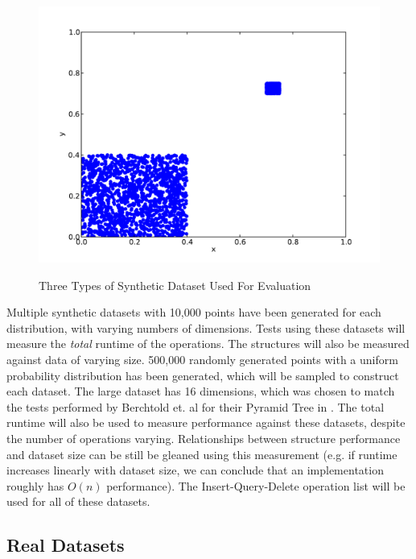 \begin{figure}
\begin{center}
			\begin{subfloat} {%
				\includegraphics[scale=0.25]{figures/clustered_distribution.pdf}
			}
			\end{subfloat}			  
		\end{center}

		\caption{Three Types of Synthetic Dataset Used For Evaluation}
		\label{fig:synthetic-data}
\end{figure}

Multiple synthetic datasets with 10,000 points have been generated for each distribution, with varying numbers of dimensions. Tests using these datasets will measure the \textit{total} runtime of the operations. The structures will also be measured against data of varying size. 500,000 randomly generated points with a uniform probability distribution has been generated, which will be sampled to construct each dataset. The large dataset has 16 dimensions, which was chosen to match the tests performed by Berchtold et. al for their Pyramid Tree in \cite{pyramid-tree}. The total runtime will also be used to measure performance against these datasets, despite the number of operations varying. Relationships between structure performance and dataset size can be still be gleaned using this measurement (e.g. if runtime increases linearly with dataset size, we can conclude that an implementation roughly has $O(n)$ performance). The Insert-Query-Delete operation list will be used for all of these datasets. 

\subsection{Real Datasets}

